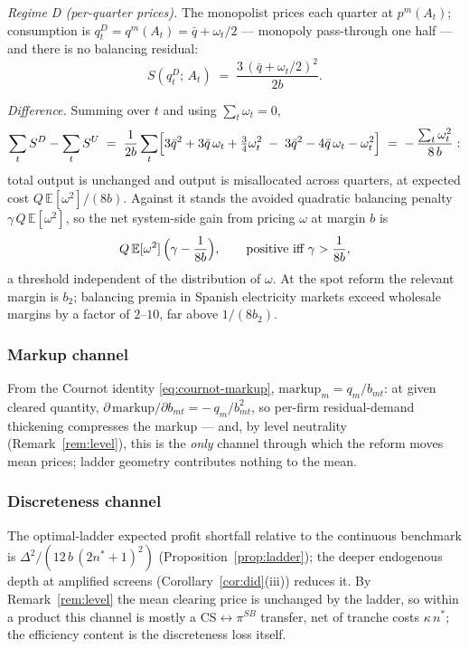 \documentclass[11pt,a4paper]{article}
\theoremstyle{definition}
\theoremstyle{remark}
\theoremstyle{plain}
\begin{document}
\emph{Regime D (per-quarter prices).} The monopolist prices each quarter at $p^m(A_t)$; consumption is $q_t^D = q^m(A_t) = \bar q + \omega_t/2$ --- monopoly pass-through one half --- and there is no balancing residual:
\[
S(q_t^D;\, A_t) \;=\; \frac{3\,(\bar q + \omega_t/2)^2}{2 b}.
\]

\emph{Difference.} Summing over $t$ and using $\sum_t \omega_t = 0$,
\[
\sum_t S^D - \sum_t S^U
\;=\; \frac{1}{2 b}\sum_t \Bigl[3\bar q^2 + 3\bar q\,\omega_t + \tfrac{3}{4}\omega_t^2 \;-\; 3\bar q^2 - 4\bar q\,\omega_t - \omega_t^2\Bigr]
\;=\; -\,\frac{\sum_t \omega_t^2}{8\, b}:
\]
total output is unchanged and output is misallocated across quarters, at expected cost $Q\,\mathbb{E}[\omega^2]/(8 b)$. Against it stands the avoided quadratic balancing penalty $\gamma\, Q\, \mathbb{E}[\omega^2]$, so the net system-side gain from pricing $\omega$ at margin $b$ is
\[
Q\,\mathbb{E}[\omega^2]\,\Bigl(\gamma - \frac{1}{8 b}\Bigr),
\qquad\text{positive iff } \gamma > \frac{1}{8 b},
\]
a threshold independent of the distribution of $\omega$. At the spot reform the relevant margin is $b_2$; balancing premia in Spanish electricity markets exceed wholesale margins by a factor of $2$--$10$, far above $1/(8 b_2)$.

\subsubsection{Markup channel}

From the Cournot identity \eqref{eq:cournot-markup}, $\text{markup}_m = q_m/b_{mt}$: at given cleared quantity, $\partial\,\text{markup}/\partial b_{mt} = -\,q_m/b_{mt}^2$, so per-firm residual-demand thickening compresses the markup --- and, by level neutrality (Remark~\ref{rem:level}), this is the \emph{only} channel through which the reform moves mean prices; ladder geometry contributes nothing to the mean.

\subsubsection{Discreteness channel}

The optimal-ladder expected profit shortfall relative to the continuous benchmark is $\Delta^2/(12\, b\,(2 n^* + 1)^2)$ (Proposition~\ref{prop:ladder}); the deeper endogenous depth at amplified screens (Corollary~\ref{cor:did}(iii)) reduces it. By Remark~\ref{rem:level} the mean clearing price is unchanged by the ladder, so within a product this channel is mostly a CS$\leftrightarrow\pi^{SB}$ transfer, net of tranche costs $\kappa\, n^*$; the efficiency content is the discreteness loss itself.
\end{document}
